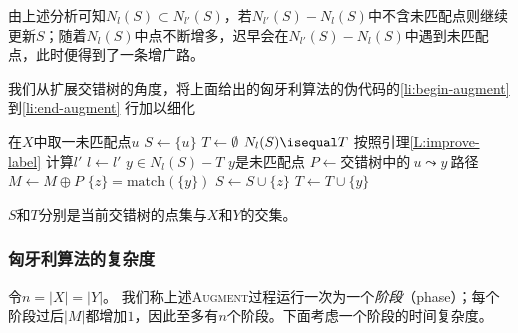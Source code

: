 \documentclass[a4paper]{ctexbook}
\newcommand{\match}{\mathrm{match}}
\begin{document}
  由上述分析可知$N_l(S)\subset N_{l'}(S)$，若$N_{l'}(S)-N_{l}(S)$中不含未匹配点则继续更新$S$；随着$N_l(S)$中点不断增多，迟早会在$N_{l'}(S)-N_{l}(S)$中遇到未匹配点，此时便得到了一条增广路。

  我们从扩展交错树的角度，将上面给出的匈牙利算法的伪代码的\ref{li:begin-augment} 到\ref{li:end-augment} 行加以细化
  \begin{codebox}
    \li 在$X$中取一未匹配点$u$
    \li $S \gets \{u\}$
    \li $T \gets\emptyset$
    \li \Repeat
    \li \If $N_l(S)\isequal T$\Then
    \li   按照引理\ref{L:improve-label} 计算$l'$\label{li:improve-label}
    \li   $l \gets l'$
        \End
    \li   \For $y \in N_l(S)-T$\Do
    \li     \If $y$是未匹配点\Then
    \li       $P \gets \text{交错树中的}\ u\leadsto y\ \text{路径}$
    \li       $M\gets M\oplus P$
    \li       \Return
    \li     \Else
    \li       $\{z\}=\match(\{y\})$
    \li       $S\gets S\cup\{z\}$\label{li:added-to-S}
    \li       $T\gets T\cup\{y\}$
            \End
          \End
  \end{codebox}
  $S$和$T$分别是当前交错树的点集与$X$和$Y$的交集。
  \subsubsection{匈牙利算法的复杂度}
  令$n=|X|=|Y|$。
  我们称上述\textsc{Augment}过程运行一次为一个\emph{阶段}（phase）；每个阶段过后$|M|$都增加$1$，因此至多有$n$个阶段。下面考虑一个阶段的时间复杂度。
\end{document}

